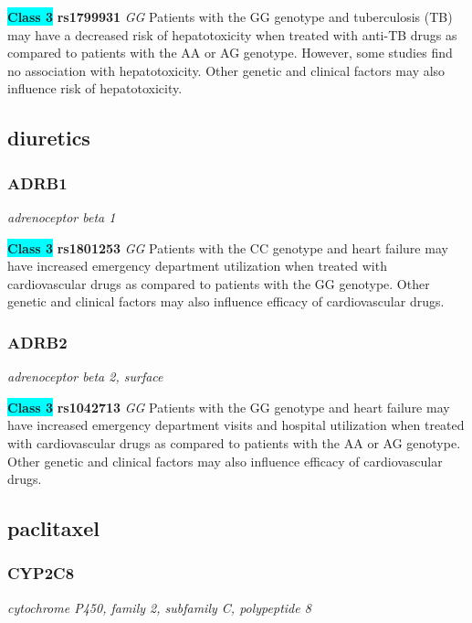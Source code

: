 \documentclass{report}
\begin{document}
\textbf{\colorbox{cyan} {Class 3}} \textbf{ rs1799931 } \textit{ GG }
Patients with the GG genotype and tuberculosis (TB) may have a decreased risk of hepatotoxicity when treated with anti-TB drugs as compared to patients with the AA or AG genotype. However, some studies find no association with hepatotoxicity. Other genetic and clinical factors may also influence risk of hepatotoxicity.\newline\subsection{ diuretics }\subsubsection{ ADRB1 }
\textit{ adrenoceptor beta 1 }

\textbf{\colorbox{cyan} {Class 3}} \textbf{ rs1801253 } \textit{ GG }
Patients with the CC genotype and heart failure may have increased emergency department utilization when treated with cardiovascular drugs as compared to patients with the GG genotype. Other genetic and clinical factors may also influence efficacy of cardiovascular drugs.\newline\subsubsection{ ADRB2 }
\textit{ adrenoceptor beta 2, surface }

\textbf{\colorbox{cyan} {Class 3}} \textbf{ rs1042713 } \textit{ GG }
Patients with the GG genotype and heart failure may have increased emergency department visits and hospital utilization when treated with cardiovascular drugs as compared to patients with the AA or AG genotype. Other genetic and clinical factors may also influence efficacy of cardiovascular drugs.\newline\subsection{ paclitaxel }\subsubsection{ CYP2C8 }
\textit{ cytochrome P450, family 2, subfamily C, polypeptide 8 }
\end{document}
